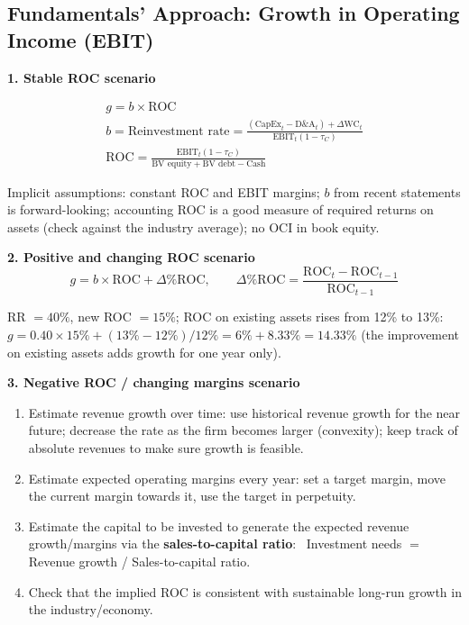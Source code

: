 \subsection{Fundamentals' Approach: Growth in Operating Income (EBIT)}
\textbf{1. Stable ROC scenario}
\begin{keybox}
\begin{gather*}
g=b\times\text{ROC}\\
b=\text{Reinvestment rate}=\frac{(\text{CapEx}_t-\text{D\&A}_t)+\Delta\text{WC}_t}{\text{EBIT}_t(1-\tau_C)}\\ \text{ROC}=\frac{\text{EBIT}_t(1-\tau_C)}{\text{BV equity}+\text{BV debt}-\text{Cash}}
\end{gather*}
\end{keybox}
Implicit assumptions: constant ROC and EBIT margins; $b$ from recent statements is forward-looking; accounting ROC is a good measure of required returns on assets (check against the industry average); no OCI in book equity.

\textbf{2. Positive and changing ROC scenario}
\[
g=b\times\text{ROC}+\Delta\%\text{ROC},\qquad \Delta\%\text{ROC}=\frac{\text{ROC}_t-\text{ROC}_{t-1}}{\text{ROC}_{t-1}}
\]
\begin{exbox}
RR $=40\%$, new ROC $=15\%$; ROC on existing assets rises from 12\% to 13\%: $g=0.40\times15\%+(13\%-12\%)/12\%=6\%+8.33\%=14.33\%$ (the improvement on existing assets adds growth for one year only).
\end{exbox}
\textbf{3. Negative ROC / changing margins scenario}
\begin{enumerate}[label=(\roman*)]
  \item Estimate revenue growth over time: use historical revenue growth for the near future; decrease the rate as the firm becomes larger (convexity); keep track of absolute revenues to make sure growth is feasible.
  \item Estimate expected operating margins every year: set a target margin, move the current margin towards it, use the target in perpetuity.
  \item Estimate the capital to be invested to generate the expected revenue growth/margins via the \textbf{sales-to-capital ratio}: \ Investment needs $=$ Revenue growth / Sales-to-capital ratio.
  \item Check that the implied ROC is consistent with sustainable long-run growth in the industry/economy.
\end{enumerate}

